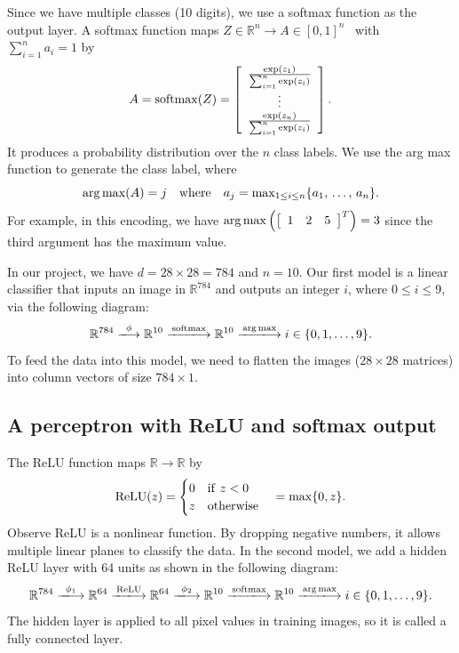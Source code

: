 \documentclass[11pt]{amsart}
\begin{document}
Since we have multiple classes (10 digits), we use a softmax function as the output layer. A softmax function maps $Z\in\mathbb{R}^{n} \to A\in [0, 1]^{n}$ \, with \, $\sum_{i=1}^{n} a_i=1$ by
$$
A={\rm softmax}(Z)=\left[\begin{array}{c} \frac{{\rm exp}(z_1)}{\sum_{i=1}^n {\rm exp}(z_i)}\\ \vdots\\ \frac{{\rm exp}(z_n)}{\sum_{i=1}^n {\rm exp}(z_i)}\end{array}\right].
$$
It produces a probability distribution over the $n$ class labels. We use the arg max function to generate the class label, where
$$
{\rm arg\,max}(A)=j \quad {\rm where} \quad a_{j}={\rm max}_{1\leq i\leq n}\{a_{1}, \,\dots , \,a_{n}\}.
$$
For example, in this encoding, we have ${\rm arg\,max} \left(\left[\begin{array}{ccc}1&2&5\end{array}\right]^T\right)
=3$ since the third argument has the maximum value.

In our project, we have $d=28\times 28=784$ and $n=10$. Our first model is a linear classifier that inputs an image in $\mathbb{R}^{784}$ and outputs an integer $i$, where $0\leq i\leq 9$, via the following diagram:
$$
\mathbb{R}^{784} \xlongrightarrow{\,\,\phi\,\,} \mathbb{R}^{10} \xlongrightarrow{\rm softmax}\mathbb{R}^{10}\xlongrightarrow{\rm arg\,max} i\in \{0, 1, \ldots, 9\}.
$$
To feed the data into this model, we need to flatten the images ($28\times 28$ matrices) into column vectors of size $784\times 1$.

\subsection{A perceptron with ReLU and softmax output} The ReLU function maps $\mathbb{R} \to \mathbb{R}$ by
$$
{\rm ReLU}(z)=\begin{cases} 0 \quad {\rm if} \,\,  z<0\\
z \quad {\rm otherwise}\end{cases}={\rm max}\{0, z\}.
$$
Observe ReLU is a nonlinear function. By dropping negative numbers, it allows multiple linear planes to classify the data.
In the second model, we add a hidden ReLU layer with 64 units as shown in the following diagram:
$$
\mathbb{R}^{784} \xlongrightarrow{\,\,\phi_1\,\,} \mathbb{R}^{64} \xlongrightarrow{\rm ReLU} \mathbb{R}^{64} \xlongrightarrow{\,\,\phi_2\,\,} \mathbb{R}^{10} \xlongrightarrow{\rm softmax}\mathbb{R}^{10}\xlongrightarrow{\rm arg\,max} i\in \{0, 1, \ldots, 9\}.
$$
The hidden layer is applied to all pixel values in training images, so it is called a fully connected layer.
\end{document}
